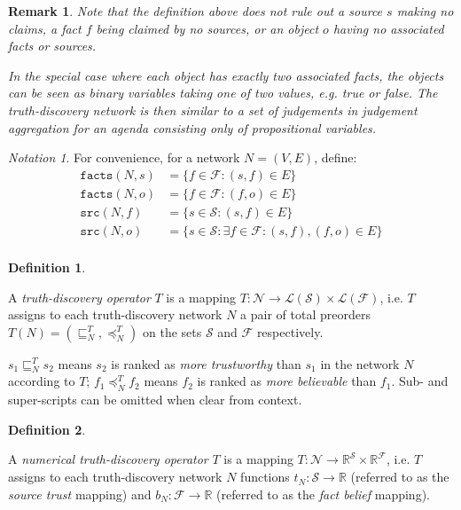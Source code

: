 \documentclass{article}
\theoremstyle{definition} \newtheorem{definition}{Definition}
\theoremstyle{definition} \newtheorem{example}{Example}
\theoremstyle{plain} \newtheorem{axiom}{Axiom}
\theoremstyle{plain} \newtheorem*{remark}{Remark}
\theoremstyle{remark} \newtheorem*{notation}{Notation}
\theoremstyle{plain} \newtheorem{lemma}{Lemma}
\theoremstyle{plain} \newtheorem{theorem}{Theorem}
\theoremstyle{plain} \newtheorem{proposition}{Proposition}
\renewcommand{\S}{\mathcal{S}}  %
\newcommand{\F}{\mathcal{F}}
\newcommand{\N}{\mathcal{N}}
\newcommand{\R}{\mathbb{R}}
\newcommand{\sle}{\sqsubseteq}
\newcommand{\fle}{\preceq}
\newcommand{\src}{\texttt{src}}
\newcommand{\fact}{\texttt{facts}}
\newcommand{\orderings}{\mathcal{L}}
\begin{document}
\begin{remark}
Note that the definition above does not rule out a source $s$ making no claims,
a fact $f$ being claimed by no sources, or an object $o$ having no associated
facts or sources.

In the special case where each object has exactly two associated facts, the
objects can be seen as \emph{binary variables} taking one of two values, e.g.
true or false. The truth-discovery network is then similar to a set of
judgements in \emph{judgement aggregation}\cite{handbook_ja} for an agenda
consisting only of propositional variables.
\end{remark}

\begin{notation}
For convenience, for a network $N=(V, E)$, define:
\begin{align*}
    \fact(N, s) &= \{f \in \F : (s, f) \in E\} \\
    \fact(N, o) &= \{f \in \F : (f, o) \in E\} \\
    \src(N, f) &= \{s \in \S : (s, f) \in E\} \\
    \src(N, o) &= \{s \in \S : \exists f \in \F : (s, f), (f, o) \in E\} \\
\end{align*}
\end{notation}

\begin{definition}
\label{def:truth_discovery_operator}

A \emph{truth-discovery operator} $T$ is a mapping $T: \N \rightarrow
\orderings(\S) \times \orderings(\F)$, i.e. $T$ assigns to each truth-discovery
network $N$ a pair of total preorders $T(N) = (\sle_N^T, \fle_N^T)$ on the sets
$\S$ and $\F$ respectively.

$s_1 \sle_N^T s_2$ means $s_2$ is ranked as \emph{more trustworthy} than $s_1$
in the network $N$ according to $T$; $f_1 \fle_N^T f_2$ means $f_2$ is ranked
as \emph{more believable} than $f_1$. Sub- and super-scripts can be omitted
when clear from context.

\end{definition}

\begin{definition}
\label{def:numerical}

A \emph{numerical truth-discovery operator} $T$ is a mapping $T: \N \rightarrow
\R^\S \times \R^\F$, i.e. $T$ assigns to each truth-discovery network $N$
functions $t_N: \S \rightarrow \R$ (referred to as the \emph{source trust}
mapping) and $b_N: \F \rightarrow \R$ (referred to as the \emph{fact belief}
mapping).

\end{definition}
\end{document}

